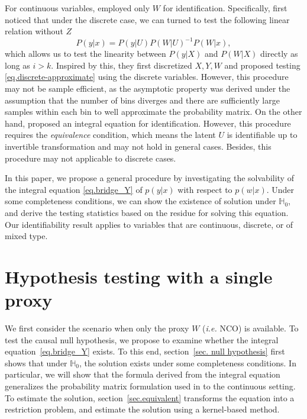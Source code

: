 \documentclass[
  12pt]{article}
\def\mH{\mathbb{H}}
\begin{document}
For continuous variables, \citet{liu2023causal, miao2023identifying} employed only $W$ for identification. Specifically, \citet{liu2023causal} first noticed that under the discrete case, we can turned to test the following linear relation without $Z$
\begin{equation}
\label{eq.discrete-approximate}
    P(y|x) = P(y| U)P(W| U)^{-1}P(W| x), 
\end{equation}
which allows us to test the linearity between $P(y| X)$ and $P(W| X)$ directly as long as $i>k$. Inspired by this, they first discretized $X, Y, W$ and proposed testing \eqref{eq.discrete-approximate} using the discrete variables. However, this procedure may not be sample efficient, as the asymptotic property was derived under the assumption that the number of bins diverges and there are sufficiently large samples within each bin to well approximate the probability matrix. On the other hand, \citet{miao2023identifying} proposed an integral equation for identification. However, this procedure requires the \emph{equivalence} condition, which means the latent $U$ is identifiable up to invertible transformation and may not hold in general cases. Besides, this procedure may not applicable to discrete cases. 


In this paper, we propose a general procedure by investigating the solvability of the integral equation \eqref{eq.bridge_Y} of $p(y|x)$ with respect to $p(w|x)$. Under some completeness conditions, we can show the existence of solution under $\mH_0$, and derive the testing statistics based on the residue for solving this equation. Our identifiability result applies to variables that are continuous, discrete, or of mixed type. 

\section{Hypothesis testing with a single proxy}\label{sec. causal-discovery}
We first consider the scenario when only the proxy $W$ (\emph{i.e.} NCO) is available. To test the causal null hypothesis, we propose to examine whether the integral equation~\eqref{eq.bridge_Y} exists. To this end, section~\ref{sec. null hypothesis} first shows that under $\mH_0$, the solution exists under some completeness conditions. In particular, we will show that the formula derived from the integral equation generalizes the probability matrix formulation used in \cite{miao2018identifying} to the continuous setting. To estimate the solution, section~\ref{sec.equivalent} transforms the equation into a restriction problem, and estimate the solution using a kernel-based method. 
\end{document}
